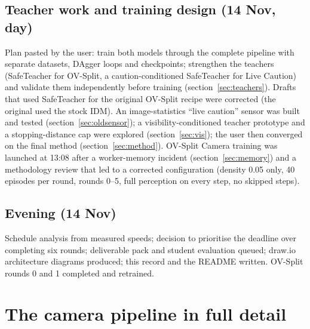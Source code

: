 \documentclass[10.5pt,a4paper]{article}
\begin{document}
\subsection{Teacher work and training design (14 Nov, day)}
Plan pasted by the user: train both models through the complete pipeline with separate datasets, DAgger loops and checkpoints; strengthen the teachers (SafeTeacher for OV-Split, a caution-conditioned SafeTeacher for Live Caution) and validate them independently before training (section~\ref{sec:teachers}). Drafts that used SafeTeacher for the original OV-Split recipe were corrected (the original used the stock IDM). An image-statistics ``live caution'' sensor was built and tested (section~\ref{sec:oldsensor}); a visibility-conditioned teacher prototype and a stopping-distance cap were explored (section~\ref{sec:vis}); the user then converged on the final method (section~\ref{sec:method}). OV-Split Camera training was launched at 13:08 after a worker-memory incident (section~\ref{sec:memory}) and a methodology review that led to a corrected configuration (density 0.05 only, 40 episodes per round, rounds 0--5, full perception on every step, no skipped steps).
\subsection{Evening (14 Nov)}
Schedule analysis from measured speeds; decision to prioritise the deadline over completing six rounds; deliverable pack and student evaluation queued; draw.io architecture diagrams produced; this record and the README written. OV-Split rounds 0 and 1 completed and retrained.

\section{The camera pipeline in full detail}\label{sec:pipeline}
\end{document}
